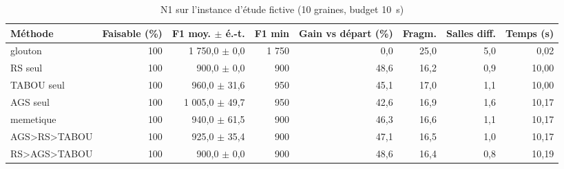 \begin{table}[htbp]
\centering
\small
\caption{N1 sur l'instance d'étude fictive (10 graines, budget 10~s)}
\label{tab:n1}
\begin{tabular}{lrrrrrrr}
\toprule
Méthode & Faisable (\%) & F1 moy. $\pm$ é.-t. & F1 min & Gain vs départ (\%) & Fragm. & Salles diff. & Temps (s) \\
\midrule
glouton & 100 & 1 750,0 $\pm$ 0,0 & 1 750 & 0,0 & 25,0 & 5,0 & 0,02 \\
RS seul & 100 & 900,0 $\pm$ 0,0 & 900 & 48,6 & 16,2 & 0,9 & 10,00 \\
TABOU seul & 100 & 960,0 $\pm$ 31,6 & 950 & 45,1 & 17,0 & 1,1 & 10,00 \\
AGS seul & 100 & 1 005,0 $\pm$ 49,7 & 950 & 42,6 & 16,9 & 1,6 & 10,17 \\
memetique & 100 & 940,0 $\pm$ 61,5 & 900 & 46,3 & 16,6 & 1,1 & 10,17 \\
AGS\textgreater{}RS\textgreater{}TABOU & 100 & 925,0 $\pm$ 35,4 & 900 & 47,1 & 16,5 & 1,0 & 10,17 \\
RS\textgreater{}AGS\textgreater{}TABOU & 100 & 900,0 $\pm$ 0,0 & 900 & 48,6 & 16,4 & 0,8 & 10,19 \\
\bottomrule
\end{tabular}
\end{table}

